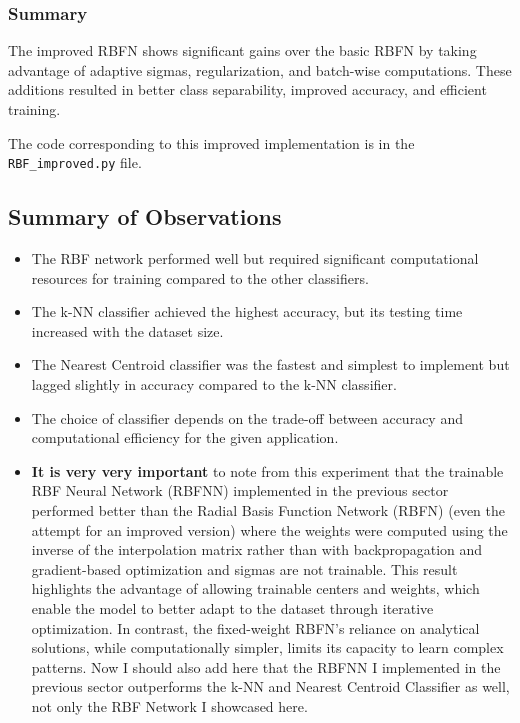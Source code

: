 \documentclass[lettersize,journal]{IEEEtran}
\begin{document}
\subsubsection{\textbf{Summary}}
The improved RBFN shows significant gains over the basic RBFN by taking advantage of adaptive sigmas, regularization, and batch-wise computations. These additions resulted in better class separability, improved accuracy, and efficient training. 

The code corresponding to this improved implementation is in the \texttt{RBF\_improved.py} file.

\subsection{\textbf{Summary of Observations}}
\begin{itemize}
    \item The RBF network performed well but required significant computational resources for training compared to the other classifiers.
    \item The k-NN classifier achieved the highest accuracy, but its testing time increased with the dataset size.
    \item The Nearest Centroid classifier was the fastest and simplest to implement but lagged slightly in accuracy compared to the k-NN classifier.
    \item The choice of classifier depends on the trade-off between accuracy and computational efficiency for the given application.
    \item \textbf{\textbf{It is very very important}} to note from this experiment that the trainable RBF Neural Network (RBFNN) implemented in the previous sector performed better than the Radial Basis Function Network (RBFN) (even the attempt for an improved version) where the weights were computed using the inverse of the interpolation matrix rather than with backpropagation and gradient-based optimization and sigmas are not trainable. This result highlights the advantage of allowing trainable centers and weights, which enable the model to better adapt to the dataset through iterative optimization. In contrast, the fixed-weight RBFN's reliance on analytical solutions, while computationally simpler, limits its capacity to learn complex patterns. Now I should also add here that the RBFNN I implemented in the previous sector outperforms the k-NN and Nearest Centroid Classifier as well, not only the RBF Network I showcased here.
\end{itemize}
\end{document}
